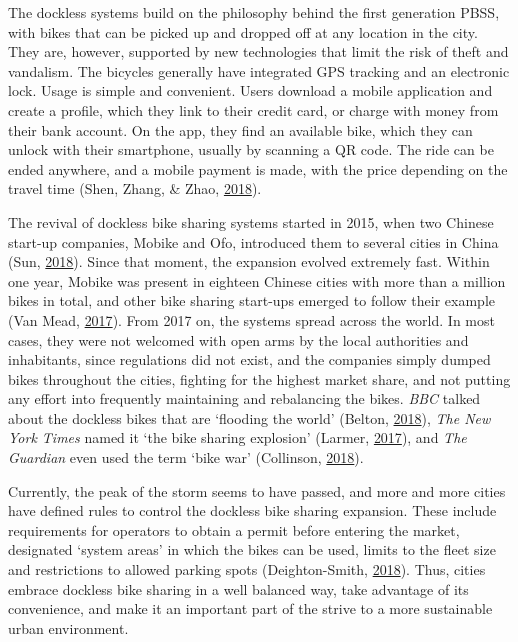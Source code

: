 \documentclass[12pt,oneside]{reedthesis}
\begin{document}
The dockless systems build on the philosophy behind the first generation
PBSS, with bikes that can be picked up and dropped off at any location
in the city. They are, however, supported by new technologies that limit
the risk of theft and vandalism. The bicycles generally have integrated
GPS tracking and an electronic lock. Usage is simple and convenient.
Users download a mobile application and create a profile, which they
link to their credit card, or charge with money from their bank account.
On the app, they find an available bike, which they can unlock with
their smartphone, usually by scanning a QR code. The ride can be ended
anywhere, and a mobile payment is made, with the price depending on the
travel time (Shen, Zhang, \& Zhao,
\protect\hyperlink{ref-shen2018}{2018}).

The revival of dockless bike sharing systems started in 2015, when two
Chinese start-up companies, Mobike and Ofo, introduced them to several
cities in China (Sun, \protect\hyperlink{ref-sun2018}{2018}). Since that
moment, the expansion evolved extremely fast. Within one year, Mobike
was present in eighteen Chinese cities with more than a million bikes in
total, and other bike sharing start-ups emerged to follow their example
(Van Mead, \protect\hyperlink{ref-guardian1}{2017}). From 2017 on, the
systems spread across the world. In most cases, they were not welcomed
with open arms by the local authorities and inhabitants, since
regulations did not exist, and the companies simply dumped bikes
throughout the cities, fighting for the highest market share, and not
putting any effort into frequently maintaining and rebalancing the
bikes. \emph{BBC} talked about the dockless bikes that are `flooding the
world' (Belton, \protect\hyperlink{ref-bbc}{2018}), \emph{The New York
Times} named it `the bike sharing explosion' (Larmer,
\protect\hyperlink{ref-nytimes}{2017}), and \emph{The Guardian} even
used the term `bike war' (Collinson,
\protect\hyperlink{ref-guardian2}{2018}).

Currently, the peak of the storm seems to have passed, and more and more
cities have defined rules to control the dockless bike sharing
expansion. These include requirements for operators to obtain a permit
before entering the market, designated `system areas' in which the bikes
can be used, limits to the fleet size and restrictions to allowed
parking spots (Deighton-Smith, \protect\hyperlink{ref-itf2018}{2018}).
Thus, cities embrace dockless bike sharing in a well balanced way, take
advantage of its convenience, and make it an important part of the
strive to a more sustainable urban environment.
\end{document}
